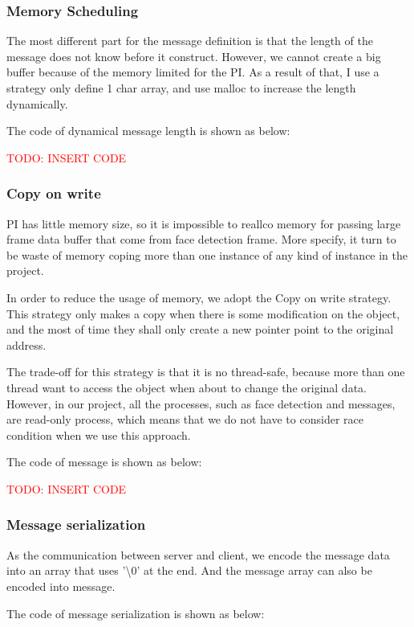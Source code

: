 \documentclass[11pt,a4paper,titlepage]{report}
\begin{document}
\subsubsection{Memory Scheduling}

The most different part for the message definition is that the length of the message does not know before it construct. However, we cannot create a big buffer because of the memory limited for the PI. As a result of that, I use a strategy only define 1 char array, and use malloc to increase the length dynamically.

The code of dynamical message length is shown as below:

\textcolor{red}{TODO: INSERT CODE}


\subsubsection{Copy on write}

PI has little memory size, so it is impossible to reallco memory for passing large frame data buffer that come from face detection frame. More specify, it turn to be waste of memory coping more than one instance of any kind of instance in the project. 

In order to reduce the usage of memory, we adopt the Copy on write strategy. This strategy only makes a copy when there is some modification on the object, and the most of time they shall only create a new pointer point to the original address.

The trade-off for this strategy is that it is no thread-safe, because more than one thread want to access the object when about to change the original data. However, in our project, all the processes, such as face detection and messages, are read-only process, which means that we do not have to consider race condition when we use this approach. 

The code of message is shown as below:


\textcolor{red}{TODO: INSERT CODE}

\subsubsection{Message serialization}

As the communication between server and client, we encode the message data into an array that uses '\textbackslash0' at the end. And the message array can also be encoded into message.

The code of message serialization is shown as below:
\end{document}
